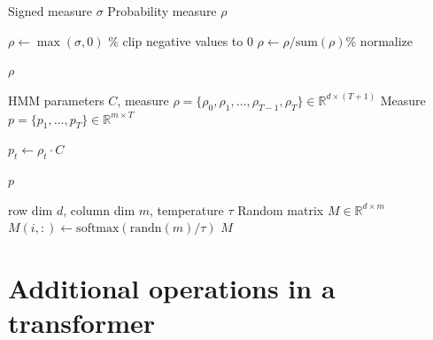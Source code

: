 \documentclass[twoside,11pt]{article}
\def\Re{\mathbb{R}}
\newcommand{\field}[1]{\mathbb{#1}}
\def\Re{\field{R}}
\def\Re{\mathbb{R}}
\renewcommand{\Re}{\mathbb{R}}
\begin{document}
\begin{algorithm}
\caption{Projection and normalization of measure}
\label{alg:normalize_rho}
\begin{algorithmic}[1]
\REQUIRE Signed measure $\sigma$
\ENSURE Probability measure $\rho$

\STATE $\rho \gets \max (\sigma,0)$ \hfill \% clip negative values to 0
\STATE $\rho \gets \rho / \text{sum}(\rho) $\hfill \% normalize
  
\RETURN $\rho$

\end{algorithmic}
\end{algorithm}


\begin{algorithm}
  \caption{Nonlinear prediction $p$}
  \label{alg:predict_p}
  \begin{algorithmic}[1]
  \REQUIRE HMM parameters $C$, measure $\rho =
  \{\rho_0,\rho_1,\hdots,\rho_{T-1},\rho_T\}\in\Re^{d\times (T+1)}$
  \ENSURE Measure $p = \{p_1,\hdots,p_{T}\}\in\Re^{m\times T}$
  
  \STATE $p_{t} \gets \rho_{t} \cdot C$
  \ENDFOR
  
  \RETURN $p$
  
  \end{algorithmic}
\end{algorithm}


  \begin{algorithm}
    \caption{Sampling a random matrix}
    \label{alg:sparse_stochastic}
    \begin{algorithmic}[1]
    \REQUIRE row dim $d$, column dim $m$, temperature $\tau$
    \ENSURE Random matrix $M\in\Re^{d\times m}$
    \STATE $M(i,:) \gets \text{softmax}(\text{randn}(m)/\tau)$
    \ENDFOR
    \RETURN $M$
    
    \end{algorithmic}
    \end{algorithm}

    \newpage
    
\section{Additional operations in a transformer}
\label{sec:xfer}
\end{document}
